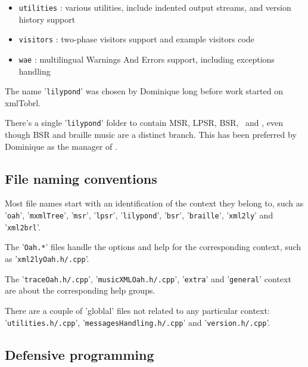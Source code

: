 \documentclass[12pt,a4paper]{article}
\begin{document}
\begin{itemize}
\item {\tt utilities} : various utilities, include indented output streams, and version history support

\item {\tt visitors} : two-phase visitors support and example visitors code

\item {\tt wae} : multilingual Warnings And Errors support, including exceptions handling

\end{itemize}

The name '{\tt lilypond}' was chosen by Dominique long before work started on \\xmlTobrl.

There's a single '{\tt lilypond}' folder to contain MSR, LPSR, BSR, \xmlToLy\ and \xmlToBrl, even though BSR and braille music are a distinct branch. This has been preferred by Dominique as the manager of \lib.


\subsection{File naming conventions}

Most file names start with an identification of the context they belong to, such as '{\tt oah}', '{\tt mxmlTree}', '{\tt msr}', '{\tt lpsr}', '{\tt lilypond}', '{\tt bsr}', '{\tt braille}', '{\tt xml2ly}' and '{\tt xml2brl}'.

The '{\tt *Oah.*}' files handle the options and help for the corresponding context, such as '{\tt xml2lyOah.h/.cpp}'.

The '{\tt traceOah.h/.cpp}', '{\tt musicXMLOah.h/.cpp}', '{\tt extra}' and '{\tt general}' context are about the corresponding help groups.

There are a couple of 'globlal' files not related to any particular context: '{\tt utilities.h/.cpp}', '{\tt messagesHandling.h/.cpp}' and '{\tt version.h/.cpp}'.


\subsection{Defensive programming}
\end{document}
